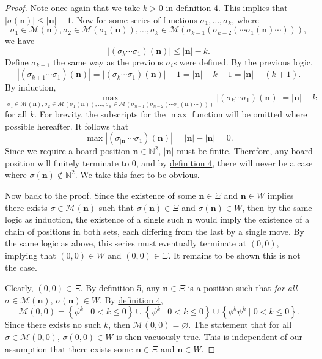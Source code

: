 \documentclass[11pt, letterpaper]{article}
\begin{document}
\begin{proof}
	Note once again that we take $k>0$ in \hyperref[dfn:4]{definition 4}. This implies that $\left| \sigma (\mathbf{n}) \right| \leq \left| \mathbf{n} \right| -1$. Now for some series of functions $\sigma _1,\ldots,\sigma _k$, where
	\[
		\sigma _1\in \mathscr{M} (\mathbf{n}),\sigma _2\in \mathscr{M} (\sigma _1(\mathbf{n})),\ldots,\sigma_k \in \mathscr{M} (\sigma _{k-1}(\sigma _{k-2}(\cdots \sigma _1(\mathbf{n})\cdots)))
	,\]
	we have
	\[
		\left| \left( \sigma _k \cdots\sigma _1 \right) (\mathbf{n}) \right| \leq \left| \mathbf{n} \right| -k
	.\]
	Define $\sigma _{k+1}$ the same way as the previous $\sigma _i$s were defined. By the previous logic,
	\[
		\left| \left( \sigma _{k+1}\cdots\sigma_1 \right) (\mathbf{n}) \right| =\left| \left( \sigma _k \cdots \sigma_1 \right) (\mathbf{n}) \right| -1=\left| \mathbf{n} \right| -k-1=\left| \mathbf{n} \right| -(k+1)
	.\]
	By induction,
	 \[
	 \max_{\sigma_1\in \mathscr{M} (\mathbf{n}),\sigma _2\in \mathscr{M} (\sigma _1(\mathbf{n})),\ldots,\sigma _{k }\in \mathscr{M} (\sigma _{n-1}(\sigma _{n-2}(\cdots \sigma _1(\mathbf{n})\cdots))) }\left| \left( \sigma _{k } \cdots \sigma _1 \right) (\mathbf{n}) \right| =\left| \mathbf{n} \right| -k
	\]
	for all $k$. For brevity, the subscripts for the $\max $ function will be omitted where possible hereafter. It follows that
	 \[
	 \max\left| \left( \sigma _{\left| \mathbf{n} \right| } \cdots \sigma _1 \right) (\mathbf{n}) \right| =\left| \mathbf{n} \right| -\left| \mathbf{n} \right| =0
	.\]
	Since we require a board position $\mathbf{n}\in \mathbb{N}^2$, $\left| \mathbf{n} \right| $ must be finite. Therefore, any board position will finitely terminate to $0$, and by \hyperref[dfn:4]{definition 4}, there will never be a case where $\sigma (\mathbf{n})\notin \mathbb{N}^2$. We take this fact to be obvious.

	Now back to the proof. Since the existence of some $\mathbf{n}\in \Xi $ and $\mathbf{n}\in W$ implies there exists $\sigma \in \mathscr{M} (\mathbf{n})$ such that $\sigma (\mathbf{n})\in \Xi $ and $\sigma (\mathbf{n})\in W$, then by the same logic as induction, the existence of a single such $\mathbf{n}$ would imply the existence of a chain of positions in both sets, each differing from the last by a single move. By the same logic as above, this series must eventually terminate at $(0,0)$, implying that $(0,0)\in W$ and $(0,0)\in \Xi $. It remains to be shown this is not the case.

	Clearly, $(0,0)\in \Xi $. By \hyperref[dfn:5]{definition 5}, any $\mathbf{n}\in\Xi $ is a position such that \emph{for all} $\sigma \in \mathscr{M} (\mathbf{n})$, $\sigma (\mathbf{n})\in W$. By \hyperref[dfn:4]{definition 4},
	\[
		\mathscr{M} (0,0)=\left\{ \phi ^k \mid 0<k\leq 0 \right\} \cup \left\{ \psi ^k \mid 0<k\leq 0 \right\} \cup \left\{ \phi ^k\psi ^k \mid 0<k\leq 0 \right\} 
	.\]
	Since there exists no such $k$, then $\mathscr{M} (0,0)=\varnothing$. The statement that for all $\sigma \in \mathscr{M} (0,0)$, $\sigma (0,0)\in W$ is then vacuously true. This is independent of our assumption that there exists some $\mathbf{n}\in \Xi $ and $\mathbf{n}\in W$.


\end{proof}
\end{document}
